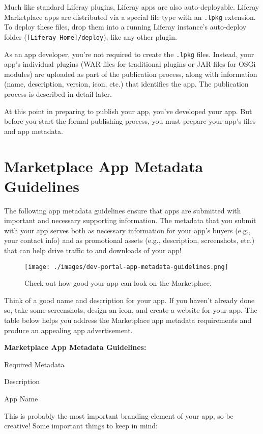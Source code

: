 Much like standard Liferay plugins, Liferay apps are also
auto-deployable. Liferay Marketplace apps are distributed via a special
file type with an \texttt{.lpkg} extension. To deploy these files, drop
them into a running Liferay instance's auto-deploy folder
(\texttt{{[}Liferay\_Home{]}/deploy}), like any other plugin.

As an app developer, you're not required to create the \texttt{.lpkg}
files. Instead, your app's individual plugins (WAR files for traditional
plugins or JAR files for OSGi modules) are uploaded as part of the
publication process, along with information (name, description, version,
icon, etc.) that identifies the app. The publication process is
described in detail later.

At this point in preparing to publish your app, you've developed your
app. But before you start the formal publishing process, you must
prepare your app's files and app metadata.

\section{Marketplace App Metadata
Guidelines}\label{marketplace-app-metadata-guidelines}

The following app metadata guidelines ensure that apps are submitted
with important and necessary supporting information. The metadata that
you submit with your app serves both as necessary information for your
app's buyers (e.g., your contact info) and as promotional assets (e.g.,
description, screenshots, etc.) that can help drive traffic to and
downloads of your app!

\begin{figure}
\centering
\texttt{[image: ./images/dev-portal-app-metadata-guidelines.png]}
\caption{Check out how good your app can look on the Marketplace.}
\end{figure}

Think of a good name and description for your app. If you haven't
already done so, take some screenshots, design an icon, and create a
website for your app. The table below helps you address the Marketplace
app metadata requirements and produce an appealing app advertisement.

\textbf{Marketplace App Metadata Guidelines:}

Required Metadata

Description

App Name

This is probably the most important branding element of your app, so be
creative! Some important things to keep in mind:

